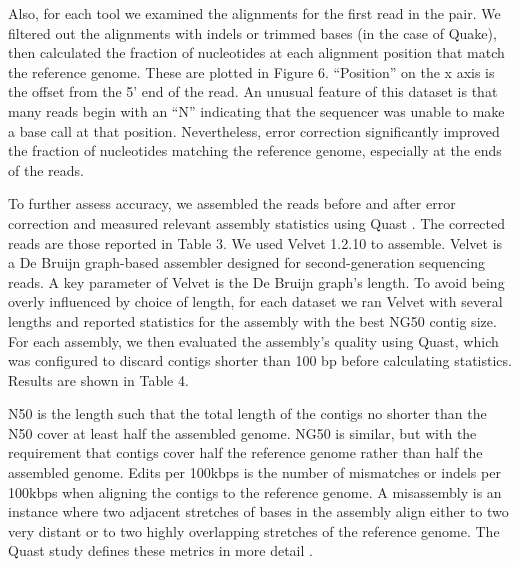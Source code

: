 \documentclass{bmcart}
\begin{document}


Also, for each tool we examined the alignments for the first read in the pair.  We filtered out the alignments with indels or trimmed bases (in the case of Quake), then calculated the fraction of nucleotides at each alignment position that match the reference genome.  These are plotted in Figure 6. ``Position'' on the x axis is the offset from the 5' end of the read.  An unusual feature of this dataset is that many reads begin with an ``N'' indicating that the sequencer was unable to make a base call at that position. Nevertheless, error correction significantly improved the fraction of nucleotides matching the reference genome, especially at the ends of the reads.



To further assess accuracy, we assembled the reads before and after error correction and measured relevant assembly statistics using Quast \cite{gurevich2013quast}.  The corrected reads are those reported in Table 3. We used Velvet 1.2.10\cite{zerbino2008velvet} to assemble.  Velvet is a De Bruijn graph-based assembler designed for second-generation sequencing reads.  A key parameter of Velvet is the De Bruijn graph's \kmer length.  To avoid being overly influenced by choice of \kmer length, for each dataset we ran Velvet with several \kmer lengths and reported statistics for the assembly with the best NG50 contig size.  For each assembly, we then evaluated the assembly's quality using Quast, which was configured to discard contigs shorter than 100 bp before calculating statistics. Results are shown in Table 4.


N50 is the length such that the total length of the contigs no shorter than the N50 cover at least half the assembled genome.  NG50 is similar, but with the requirement that contigs cover half the reference genome rather than half the assembled genome. Edits per 100kbps is the number of mismatches or indels per 100kbps when aligning the contigs to the reference genome. A misassembly is an instance where two adjacent stretches of bases in the assembly align either to two very distant or to two highly overlapping stretches of the reference genome.  The Quast study defines these metrics in more detail \cite{gurevich2013quast}.
\end{document}
